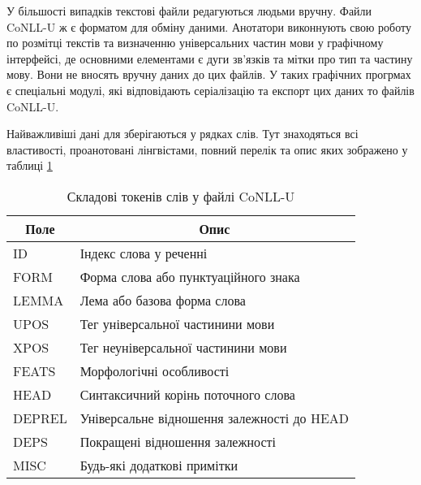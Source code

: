 У більшості випадків текстові файли редагуються людьми вручну. Файли
CoNLL-U ж є форматом для обміну даними. Анотатори виконнують свою
роботу по розмітці текстів та визначенню універсальних частин мови
у графічному інтерфейсі, де основними елементами є дуги зв'язків
та мітки про тип та частину мову. Вони не вносять вручну даних до
цих файлів. У таких графічних прогрмах є спеціальні модулі,
які відповідають серіалізацію та експорт цих даних то файлів CoNLL-U.

Найважливіші дані для зберігаються у рядках слів. Тут знаходяться всі властивості,
проанотовані лінгвістами, повний перелік та опис яких зображено у
таблиці \ref{table:conllu}

\begin{table}[ht]
\centering
\begin{tabular}{|l|l|}
\hline
\multicolumn{1}{|c|}{Поле} & \multicolumn{1}{|c|}{Опис} \\ \hline
  
ID        & Індекс слова у реченні \\ \hline
FORM      & Форма слова або пунктуаційного знака \\ \hline
LEMMA     & Лема або базова форма слова \\ \hline
UPOS      & Тег універсальної частинини мови \\ \hline
XPOS      & Тег неуніверсальної частинини мови \\ \hline
FEATS     & Морфологічні особливості \\ \hline
HEAD      & Синтаксичний корінь поточного слова \\ \hline
DEPREL    & Універсальне відношення залежності до HEAD \\ \hline
DEPS      & Покращені відношення залежності \\ \hline
MISC      & Будь-які додаткові примітки \\ \hline
\end{tabular}
\caption{Складові токенів слів у файлі CoNLL-U}
\label{table:conllu}
\end{table}